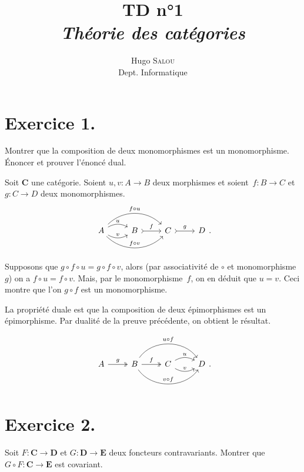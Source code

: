 \documentclass{../../td}
\title{TD n°1\\\itshape Théorie des catégories}
\author{Hugo \textsc{Salou}\\ Dept. Informatique}
\begin{document}
  \maketitle

  \tableofcontents

  \chapter{Exercice 1.}

  \begin{slshape}
    \color{deepblue}
    Montrer que la composition de deux monomorphismes est un monomorphisme.
    Énoncer et prouver l'énoncé dual.
  \end{slshape}

  Soit $\mathbf{C}$ une catégorie. Soient $u,v : A \to B$ deux morphismes et soient~$f : B \to C$ et $g : C \to D$ deux monomorphismes.
  \[
  \begin{tikzcd}
    A \arrow[bend left]{r}{u}\arrow[bend right]{r}{v} \arrow[bend left=45]{rr}{f \circ u} \arrow[bend right=45]{rr}{f \circ v} & B \arrow[tail]{r}{f} & C \arrow[tail]{r}{g} & D
  \end{tikzcd}
  .\]

  Supposons que $g\circ f \circ u = g \circ f \circ v$, alors (par associativité de $\circ$ et monomorphisme $g$) on a $f \circ u = f \circ v$.
  Mais, par le monomorphisme~$f$, on en déduit que $u = v$.
  Ceci montre que l'on $g\circ f$ est un monomorphisme.

  La propriété duale est que la composition de deux épimorphismes est un épimorphisme.
  Par dualité de la preuve précédente, on obtient le résultat.

  \[
    \begin{tikzcd}
      A \arrow[two heads]{r}{g} & B \arrow[two heads]{r}{f} \arrow[bend left=55]{rr}{u \circ f}\arrow[bend right=55]{rr}{v\circ f} & C \arrow[bend left]{r}{u} \arrow[bend right]{r}{v} & D
    \end{tikzcd}
  .\]

  \chapter{Exercice 2.}

  \begin{slshape}
    \color{deepblue}
    Soit $F : \mathbf{C} \to \mathbf{D}$ et $G : \mathbf{D} \to \mathbf{E}$ deux foncteurs contravariants.
    Montrer que $G \circ F : \mathbf{C} \to \mathbf{E}$ est covariant.
  \end{slshape}
\end{document}
